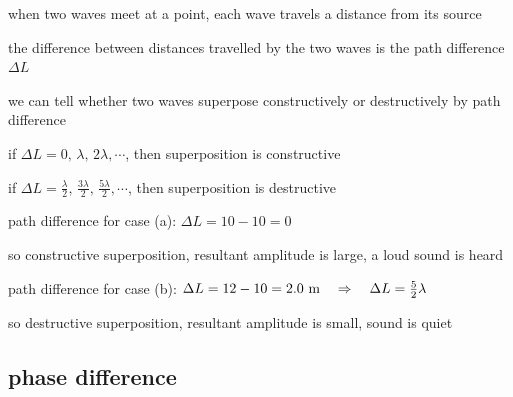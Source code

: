 when two waves meet at a point, each wave travels a distance from its source

the difference between distances travelled by the two waves is the path difference $\Delta L$

\cmt we can tell whether two waves superpose constructively or destructively by path difference

{

\centering
\vspace*{6pt}
\begin{tcolorbox}[colframe=orange, colback=yellow!30, width=0.65\textwidth]
	\setlength{\baselineskip}{\baselineskip}%
	
	\centering
	
	if ${\Delta L = 0, \, \lambda, \, 2\lambda, \cdots}$, then superposition is constructive
	
	if ${\Delta L = \frac{\lambda}{2}, \, \frac{3\lambda}{2}, \, \frac{5\lambda}{2}, \cdots}$, then superposition is destructive
	
\end{tcolorbox}\vspace*{-4pt}

}

\newpage


\begin{soln} path difference for case (a): $\Delta L = 10 - 10  = 0$

so constructive superposition, resultant amplitude is large, a loud sound is heard

path difference for case (b): $\Delta L = 12 - 10 = 2.0 \text{ m} \quad \Rightarrow \quad \Delta L = \frac{5}{2}\lambda$

so destructive superposition, resultant amplitude is small, sound is quiet \end{soln}

\subsection{phase difference}

